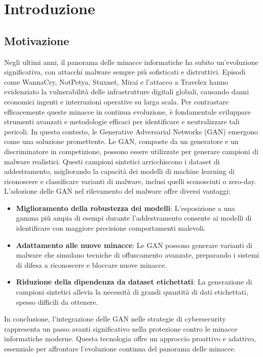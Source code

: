 \chapter{Introduzione}
\label{cap:introduzione}

\section{Motivazione}
Negli ultimi anni, il panorama delle minacce informatiche ha subito un'evoluzione significativa, con attacchi malware sempre più sofisticati e distruttivi. Episodi come WannaCry, NotPetya, Stuxnet, Mirai e l'attacco a Travelex hanno evidenziato la vulnerabilità delle infrastrutture digitali globali, causando danni economici ingenti e interruzioni operative su larga scala.
Per contrastare efficacemente queste minacce in continua evoluzione, è fondamentale sviluppare strumenti avanzati e metodologie efficaci per identificare e neutralizzare tali pericoli. In questo contesto, le Generative Adversarial Networks (GAN) emergono come una soluzione promettente. Le GAN, composte da un generatore e un discriminatore in competizione, possono essere utilizzate per generare campioni di malware realistici. Questi campioni sintetici arricchiscono i dataset di addestramento, migliorando la capacità dei modelli di machine learning di riconoscere e classificare varianti di malware, inclusi quelli sconosciuti o zero-day.
L'adozione delle GAN nel rilevamento del malware offre diversi vantaggi:
\begin{itemize} 
    \item \textbf{Miglioramento della robustezza dei modelli}: L'esposizione a una gamma più ampia di esempi durante l'addestramento consente ai modelli di identificare con maggiore precisione comportamenti malevoli. 
    \item \textbf{Adattamento alle nuove minacce}: Le GAN possono generare varianti di malware che simulano tecniche di offuscamento avanzate, preparando i sistemi di difesa a riconoscere e bloccare nuove minacce. 
    \item \textbf{Riduzione della dipendenza da dataset etichettati}: La generazione di campioni sintetici allevia la necessità di grandi quantità di dati etichettati, spesso difficili da ottenere. 
\end{itemize}
In conclusione, l'integrazione delle GAN nelle strategie di cybersecurity rappresenta un passo avanti significativo nella protezione contro le minacce informatiche moderne. Questa tecnologia offre un approccio proattivo e adattivo, essenziale per affrontare l'evoluzione continua del panorama delle minacce.



